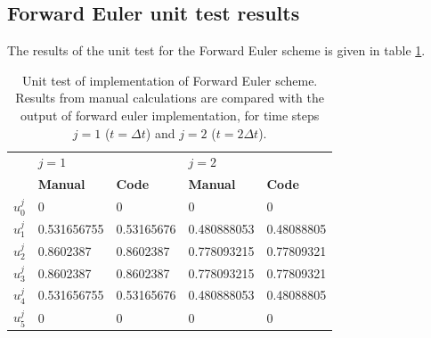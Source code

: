 \documentclass[12pt]{extarticle}
\begin{document}
\subsection*{Forward Euler unit test results}
The results of the unit test for the Forward Euler scheme is given in table \ref{tab:unit_test}.  
\begin{table}[h]
	\centering
	\begin{tabular}{l|ll|ll|}
		\cline{2-5}
		& \multicolumn{2}{l|}{\textbf{$j=1$}}                 & \multicolumn{2}{l|}{\textbf{$j=2$}}                  \\ \cline{2-5} 
		& \multicolumn{1}{l|}{\textbf{Manual}} & \textbf{Code} & \multicolumn{1}{l|}{\textbf{Manual}} & \textbf{Code} \\ \hline
		\multicolumn{1}{|l|}{$u_0^j$} & \multicolumn{1}{l|}{0}               & 0             & \multicolumn{1}{l|}{0}               & 0             \\ \hline
		\multicolumn{1}{|l|}{$u_1^j$} & \multicolumn{1}{l|}{0.531656755}     & 0.53165676    & \multicolumn{1}{l|}{0.480888053}     & 0.48088805    \\ \hline
		\multicolumn{1}{|l|}{$u_2^j$} & \multicolumn{1}{l|}{0.8602387}       & 0.8602387     & \multicolumn{1}{l|}{0.778093215}     & 0.77809321    \\ \hline
		\multicolumn{1}{|l|}{$u_3^j$} & \multicolumn{1}{l|}{0.8602387}       & 0.8602387     & \multicolumn{1}{l|}{0.778093215}     & 0.77809321    \\ \hline
		\multicolumn{1}{|l|}{$u_4^j$} & \multicolumn{1}{l|}{0.531656755}     & 0.53165676    & \multicolumn{1}{l|}{0.480888053}     & 0.48088805    \\ \hline
		\multicolumn{1}{|l|}{$u_5^j$} & \multicolumn{1}{l|}{0}               & 0             & \multicolumn{1}{l|}{0}               & 0             \\ \hline
	\end{tabular}
	\caption{Unit test of implementation of Forward Euler scheme. Results from manual calculations are compared with the output of forward euler implementation, for time steps $j=1$ ($t = \Delta t$) and $j=2$ ($t = 2\Delta t$).}
	\label{tab:unit_test}
\end{table}




\end{document}
